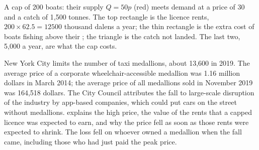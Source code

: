 \begin{omfigure}

{\small A cap of 200 boats: their supply $Q = 50p$ (red) meets demand at a price of 30
and a catch of 1,500 tonnes. The top rectangle is the licence rents,
$200 \times 62.5 = 12500$ thousand dalens a year; the thin rectangle is the extra cost
of boats fishing above their ; the triangle is the
catch not landed. The last two, 5,000 a year, are what the cap costs.}
\end{omfigure}

\begin{record}
New York City limits the number of taxi medallions, about 13,600 in 2019.
The average price of a corporate wheelchair-accessible medallion was 1.16
million dollars in March 2014; the average price of all medallions sold in
November 2019 was 164,518 dollars. The City Council attributes the fall to
large-scale disruption of the industry by app-based companies, which
could put cars on the street without medallions. %
 explains the high price, the value of the rents that a
capped licence was expected to earn, and why the price fell as soon as
those rents were expected to shrink. The loss fell on whoever owned a
medallion when the fall came, including those who had just paid the peak
price.
\end{record}

